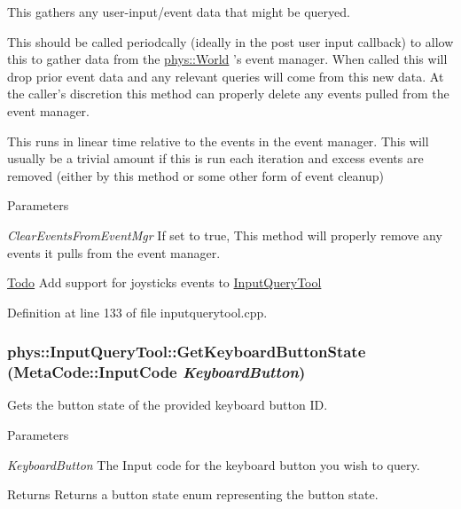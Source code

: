 This gathers any user-\/input/event data that might be queryed. 

This should be called periodcally (ideally in the post user input callback) to allow this to gather data from the \hyperlink{classphys_1_1World}{phys::World} 's event manager. When called this will drop prior event data and any relevant queries will come from this new data. At the caller's discretion this method can properly delete any events pulled from the event manager. \par
 \par
 This runs in linear time relative to the events in the event manager. This will usually be a trivial amount if this is run each iteration and excess events are removed (either by this method or some other form of event cleanup) 
\begin{DoxyParams}{Parameters}
\item[{\em ClearEventsFromEventMgr}]If set to true, This method will properly remove any events it pulls from the event manager. \end{DoxyParams}


\begin{Desc}
\item[\hyperlink{todo__todo000014}{Todo}]Add support for joysticks events to \hyperlink{classphys_1_1InputQueryTool}{InputQueryTool} \end{Desc}




Definition at line 133 of file inputquerytool.cpp.

\hypertarget{classphys_1_1InputQueryTool_ad279cce170ff68ba9f343f6b22b2c621}{
\subsubsection[{GetKeyboardButtonState}]{ phys::InputQueryTool::GetKeyboardButtonState ({\bf MetaCode::InputCode} {\em KeyboardButton})}}
\label{da/d96/classphys_1_1InputQueryTool_ad279cce170ff68ba9f343f6b22b2c621}


Gets the button state of the provided keyboard button ID. 


\begin{DoxyParams}{Parameters}
\item[{\em KeyboardButton}]The Input code for the keyboard button you wish to query. \end{DoxyParams}
\begin{DoxyReturn}{Returns}
Returns a button state enum representing the button state. 
\end{DoxyReturn}


